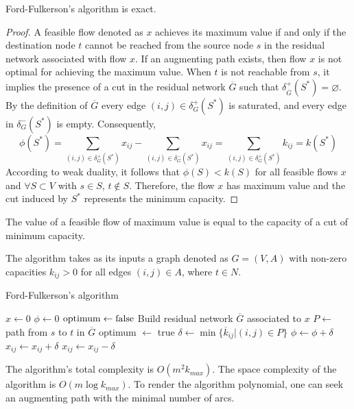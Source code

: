 \documentclass[12pt, a4paper]{report}
\begin{document}
    \begin{proposition}
        Ford-Fulkerson's algorithm is exact. 
    \end{proposition}
    \begin{proof}
        A feasible flow denoted as $x$  achieves its maximum value if and only if the destination node $t$ cannot be reached from the source node $s$ in the residual network associated with flow $x$. 
        If an augmenting path exists, then flow $x$ is not optimal for achieving the maximum value.
        When $t$ is not reachable from $s$, it implies the presence of a cut in the residual network $\overline{G}$ such that $\delta^{+}_{\overline{G}}(S^{*})=\varnothing$. 
        By the definition of $\overline{G}$  every edge $(i,j) \in \delta^{+}_{G}(S^{*})$ is saturated, and every edge in $\delta^{-}_{G}(S^{*})$ is empty. 
        Consequently,
        \[\phi(S^{*})=\sum_{(i,j) \in \delta^{+}_{G}(S^{*})}{x_{ij}}-\sum_{(i,j) \in \delta^{-}_{G}(S^{*})}{x_{ij}}= \sum_{(i,j) \in \delta^{+}_{G}(S^{*})}{k_{ij}}=k(S^{*})\]
        According to weak duality, it follows that $\phi(S) < k(S)$ for all feasible flows $x$ and $\forall S \subset V$ with $s \in S$, $t \notin S$. 
        Therefore, the flow $x$ has maximum value and the cut induced by $S^{*}$ represents the minimum capacity.
    \end{proof}
    \begin{theorem}
        The value of a feasible flow of maximum value is equal to the capacity of a cut of minimum capacity.
    \end{theorem}
    The algorithm takes as its inputs a graph denoted as $G=(V,A)$ with non-zero capacities $k_{ij}>0$ for all edges $(i,j) \in A$, where $t \in N$. 
    \begin{algorithm}[H]
        \caption{Ford-Fulkerson's algorithm}
            \begin{algorithmic}[1]
                \State $x \leftarrow 0$
                \State $\phi \leftarrow 0$
                \State $\textnormal{optimum} \leftarrow \textnormal{false}$
                    \State Build residual network $\overline{G}$ associated to $x$
                    \State $P \leftarrow$ path from $s$ to $t$ in $\overline{G}$
                        \State optimum $\leftarrow$ true
                    \Else
                        \State $\delta \leftarrow \min\{\overline{k}_{ij}|(i,j) \in P\}$
                        \State $\phi \leftarrow \phi + \delta$
                                \State $x_{ij} \leftarrow x_{ij}+\delta$
                            \Else 
                                \State $x_{ij} \leftarrow x_{ij}-\delta$
                            \EndIf
                        \EndFor
                    \EndIf
                \EndWhile
            \end{algorithmic}
    \end{algorithm}
    The algorithm's total complexity is $O(m^2k_{max})$. 
    The space complexity of the algorithm is $O(m\log{k_{max}})$. 
    To render the algorithm polynomial, one can seek an augmenting path with the minimal number of arcs.
\end{document}
